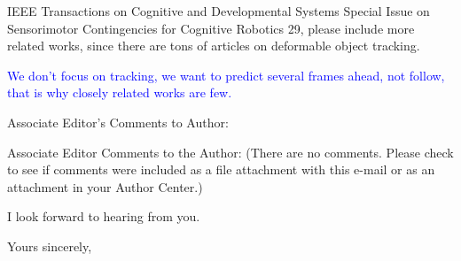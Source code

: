 \documentclass[a4paper,12pt]{letter}
\newcommand{\comment}[1]{\textcolor{blue}{#1}}
\begin{document}
\begin{letter}{IEEE Transactions on Cognitive and Developmental Systems\newline
Special Issue on Sensorimotor Contingencies for Cognitive Robotics}
29, please include more related works, since there are tons of articles on deformable object tracking.

\comment{We don't focus on tracking, we want to predict several frames ahead, not follow, that is why closely related works are few.}

Associate Editor's Comments to Author: 

Associate Editor 
Comments to the Author: 
(There are no comments. Please check to see if comments were included as a file attachment with this e-mail or as an attachment in your Author Center.)


I look forward to hearing from you.


\signature{Dra. Verónica Esther Arriola Ríos\\
Profesora Asociada C de T.C.\newline
Departamento de Matemáticas, Cub 119.\newline
Facultad de Ciencias, UNAM \newline
v.arriola@ciencias.unam.mx \newline
+(52)55 5622 5426}

\closing{Yours sincerely,}


\end{letter}
\end{document}
